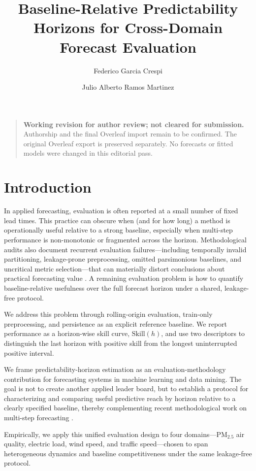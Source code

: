 \documentclass[pdflatex]{sn-jnl}
\title[Baseline-relative predictability horizons]{Baseline-Relative Predictability Horizons for Cross-Domain Forecast Evaluation}
\author*[1]{Federico Garcia Crespi}
\author[2]{Julio Alberto Ramos Martinez}
\affil[1]{Departamento de Ingenier\'ia de Computadores, Universidad Miguel Hern\'andez, Elche, Spain}
\affil[2]{Departamento de Estad\'istica, Matem\'aticas e Inform\'atica, Universidad Miguel Hern\'andez, Elche, Spain}
\begin{document}
\maketitle

\begin{quote}
\small\textbf{Working revision for author review; not cleared for submission.}
Authorship and the final Overleaf import remain to be confirmed. The original Overleaf export is
preserved separately. No forecasts or fitted models were changed in this
editorial pass.
\end{quote}




\section{Introduction}

In applied forecasting, evaluation is often reported at a small number of fixed lead times. This practice can obscure when (and for how long) a method is operationally useful relative to a strong baseline, especially when multi-step performance is non-monotonic or fragmented across the horizon. Methodological audits also document recurrent evaluation failures—including temporally invalid partitioning, leakage-prone preprocessing, omitted parsimonious baselines, and uncritical metric selection—that can materially distort conclusions about practical forecasting value \citep{hewamalage2023dmkd}. A remaining evaluation problem is how to quantify baseline-relative usefulness over the full forecast horizon under a shared, leakage-free protocol.

We address this problem through rolling-origin evaluation, train-only preprocessing, and persistence as an explicit reference baseline. We report performance as a horizon-wise skill curve, $\mathrm{Skill}(h)$, and use two descriptors to distinguish the last horizon with positive skill from the longest uninterrupted positive interval.

We frame predictability-horizon estimation as an evaluation-methodology contribution for forecasting systems in machine learning and data mining. The goal is not to create another applied leader board, but to establish a protocol for characterizing and comparing useful predictive reach by horizon relative to a clearly specified baseline, thereby complementing recent methodological work on multi-step forecasting \citep{green2025stratify,kreuzer2025trend}.

Empirically, we apply this unified evaluation design to four domains—PM$_{2.5}$ air quality, electric load, wind speed, and traffic speed—chosen to span heterogeneous dynamics and baseline competitiveness under the same leakage-free protocol.
\end{document}
